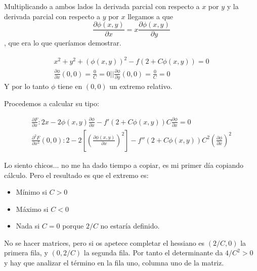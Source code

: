 \begin{problem}[1]
Multiplicando a ambos lados la derivada parcial con respecto a $x$ por $y$ y la derivada parcial con respecto a $y$ por $x$ llegamos a que \[ \frac{\partial  \phi (x,y)}{\partial  x} = x\frac{\partial  \phi (x,y)}{\partial  y} \], que era lo que queríamos demostrar.

\spart 

\begin{gather*}
x^2 + y^2 + (\phi (x,y))^2 -f(2+C\phi (x,y)) = 0 \\
\frac{\partial  \phi}{\partial  x}(0,0) = \frac{0}{C} = 0 ||
\frac{\partial  \phi}{\partial  y}(0,0) = \frac{0}{C} = 0
\end{gather*}
Y por lo tanto $\phi$ tiene en $(0,0)$ un extremo relativo.

Procedemos a calcular su tipo:

\begin{gather*}
\frac{\partial  F}{\partial  x}: 2x-2\phi (x,y)\frac{\partial  \phi}{\partial  x}-f'(2+C\phi (x, y))C\frac{\partial  \phi}{\partial  x} = 0 \\
\frac{\partial  ^2 F}{\partial  x^2}(0,0): 2-2[(\frac{\partial  \phi (x,y)}{\partial  x})^2] - f''(2+C\phi (x,y))C^2(\frac{\partial  \phi}{\partial  x})^2
\end{gather*}

Lo siento chicos... no me ha dado tiempo a copiar, es mi primer día copiando cálculo. Pero el resultado es que el extremo es:

\begin{itemize}
\item Mínimo si $C>0$
\item Máximo si $C<0$
\item Nada si $C=0$ porque $2/C$ no estaría definido. 
\end{itemize}

No se hacer matrices, pero si os apetece completar el hessiano es $(2/C, 0)$ la primera fila, y $(0, 2/C)$ la segunda fila. Por tanto el determinante da $4/C^2 > 0$ y hay que analizar el término en la fila uno, columna uno de la matriz.
\end{problem}

